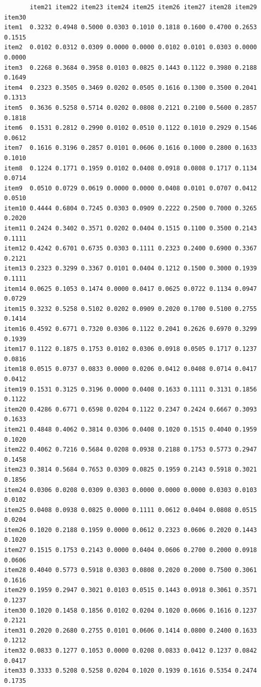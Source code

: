 \documentclass[
  a4paper,
]{ltjsbook}
\begin{document}
\begin{verbatim}
       item21 item22 item23 item24 item25 item26 item27 item28 item29 item30
item1  0.3232 0.4948 0.5000 0.0303 0.1010 0.1818 0.1600 0.4700 0.2653 0.1515
item2  0.0102 0.0312 0.0309 0.0000 0.0000 0.0102 0.0101 0.0303 0.0000 0.0000
item3  0.2268 0.3684 0.3958 0.0103 0.0825 0.1443 0.1122 0.3980 0.2188 0.1649
item4  0.2323 0.3505 0.3469 0.0202 0.0505 0.1616 0.1300 0.3500 0.2041 0.1313
item5  0.3636 0.5258 0.5714 0.0202 0.0808 0.2121 0.2100 0.5600 0.2857 0.1818
item6  0.1531 0.2812 0.2990 0.0102 0.0510 0.1122 0.1010 0.2929 0.1546 0.0612
item7  0.1616 0.3196 0.2857 0.0101 0.0606 0.1616 0.1000 0.2800 0.1633 0.1010
item8  0.1224 0.1771 0.1959 0.0102 0.0408 0.0918 0.0808 0.1717 0.1134 0.0714
item9  0.0510 0.0729 0.0619 0.0000 0.0000 0.0408 0.0101 0.0707 0.0412 0.0510
item10 0.4444 0.6804 0.7245 0.0303 0.0909 0.2222 0.2500 0.7000 0.3265 0.2020
item11 0.2424 0.3402 0.3571 0.0202 0.0404 0.1515 0.1100 0.3500 0.2143 0.1111
item12 0.4242 0.6701 0.6735 0.0303 0.1111 0.2323 0.2400 0.6900 0.3367 0.2121
item13 0.2323 0.3299 0.3367 0.0101 0.0404 0.1212 0.1500 0.3000 0.1939 0.1111
item14 0.0625 0.1053 0.1474 0.0000 0.0417 0.0625 0.0722 0.1134 0.0947 0.0729
item15 0.3232 0.5258 0.5102 0.0202 0.0909 0.2020 0.1700 0.5100 0.2755 0.1414
item16 0.4592 0.6771 0.7320 0.0306 0.1122 0.2041 0.2626 0.6970 0.3299 0.1939
item17 0.1122 0.1875 0.1753 0.0102 0.0306 0.0918 0.0505 0.1717 0.1237 0.0816
item18 0.0515 0.0737 0.0833 0.0000 0.0206 0.0412 0.0408 0.0714 0.0417 0.0412
item19 0.1531 0.3125 0.3196 0.0000 0.0408 0.1633 0.1111 0.3131 0.1856 0.1122
item20 0.4286 0.6771 0.6598 0.0204 0.1122 0.2347 0.2424 0.6667 0.3093 0.1633
item21 0.4848 0.4062 0.3814 0.0306 0.0408 0.1020 0.1515 0.4040 0.1959 0.1020
item22 0.4062 0.7216 0.5684 0.0208 0.0938 0.2188 0.1753 0.5773 0.2947 0.1458
item23 0.3814 0.5684 0.7653 0.0309 0.0825 0.1959 0.2143 0.5918 0.3021 0.1856
item24 0.0306 0.0208 0.0309 0.0303 0.0000 0.0000 0.0000 0.0303 0.0103 0.0102
item25 0.0408 0.0938 0.0825 0.0000 0.1111 0.0612 0.0404 0.0808 0.0515 0.0204
item26 0.1020 0.2188 0.1959 0.0000 0.0612 0.2323 0.0606 0.2020 0.1443 0.1020
item27 0.1515 0.1753 0.2143 0.0000 0.0404 0.0606 0.2700 0.2000 0.0918 0.0606
item28 0.4040 0.5773 0.5918 0.0303 0.0808 0.2020 0.2000 0.7500 0.3061 0.1616
item29 0.1959 0.2947 0.3021 0.0103 0.0515 0.1443 0.0918 0.3061 0.3571 0.1237
item30 0.1020 0.1458 0.1856 0.0102 0.0204 0.1020 0.0606 0.1616 0.1237 0.2121
item31 0.2020 0.2680 0.2755 0.0101 0.0606 0.1414 0.0800 0.2400 0.1633 0.1212
item32 0.0833 0.1277 0.1053 0.0000 0.0208 0.0833 0.0412 0.1237 0.0842 0.0417
item33 0.3333 0.5208 0.5258 0.0204 0.1020 0.1939 0.1616 0.5354 0.2474 0.1735

\end{verbatim}
\end{document}
